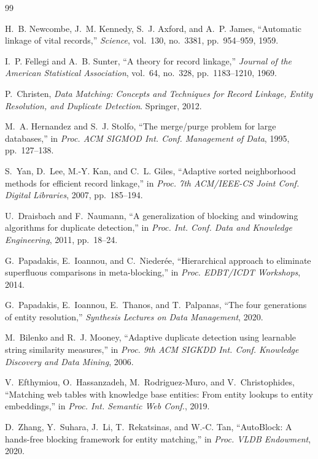 \documentclass[conference]{IEEEtran}
\begin{document}
\begin{thebibliography}{99}

H.~B. Newcombe, J.~M. Kennedy, S.~J. Axford, and A.~P. James,
``Automatic linkage of vital records,''
\emph{Science}, vol.~130, no.~3381, pp.~954--959, 1959.

I.~P. Fellegi and A.~B. Sunter,
``A theory for record linkage,''
\emph{Journal of the American Statistical Association}, vol.~64, no.~328,
pp.~1183--1210, 1969.

P.~Christen,
\emph{Data Matching: Concepts and Techniques for Record Linkage, Entity
  Resolution, and Duplicate Detection}.
Springer, 2012.

M.~A. Hernandez and S.~J. Stolfo,
``The merge/purge problem for large databases,''
in \emph{Proc. ACM SIGMOD Int. Conf. Management of Data}, 1995,
pp.~127--138.

S.~Yan, D.~Lee, M.-Y. Kan, and C.~L. Giles,
``Adaptive sorted neighborhood methods for efficient record linkage,''
in \emph{Proc. 7th ACM/IEEE-CS Joint Conf. Digital Libraries}, 2007,
pp.~185--194.

U.~Draisbach and F.~Naumann,
``A generalization of blocking and windowing algorithms for duplicate
  detection,''
in \emph{Proc. Int. Conf. Data and Knowledge Engineering}, 2011,
pp.~18--24.

G.~Papadakis, E.~Ioannou, and C.~Nieder\'{e}e,
``Hierarchical approach to eliminate superfluous comparisons in
  meta-blocking,''
in \emph{Proc. EDBT/ICDT Workshops}, 2014.

G.~Papadakis, E.~Ioannou, E.~Thanos, and T.~Palpanas,
``The four generations of entity resolution,''
\emph{Synthesis Lectures on Data Management}, 2020.

M.~Bilenko and R.~J. Mooney,
``Adaptive duplicate detection using learnable string similarity measures,''
in \emph{Proc. 9th ACM SIGKDD Int. Conf. Knowledge Discovery and Data
  Mining}, 2006.

V.~Efthymiou, O.~Hassanzadeh, M.~Rodriguez-Muro, and V.~Christophides,
``Matching web tables with knowledge base entities: From entity lookups to
  entity embeddings,''
in \emph{Proc. Int. Semantic Web Conf.}, 2019.

D.~Zhang, Y.~Suhara, J.~Li, T.~Rekatsinas, and W.-C. Tan,
``AutoBlock: A hands-free blocking framework for entity matching,''
in \emph{Proc. VLDB Endowment}, 2020.


\end{thebibliography}
\end{document}
